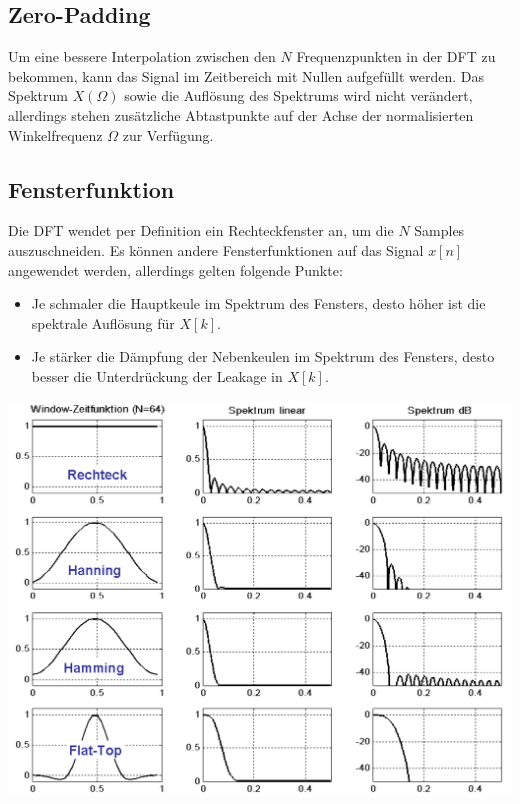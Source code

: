 \subsection{Zero-Padding}
Um eine bessere Interpolation zwischen den $N$ Frequenzpunkten in der DFT zu
bekommen, kann das Signal im Zeitbereich mit Nullen aufgefüllt werden.
Das Spektrum $X(\Omega)$ sowie die Auflösung des Spektrums wird nicht verändert, 
allerdings stehen zusätzliche Abtastpunkte auf der Achse der normalisierten 
Winkelfrequenz $\Omega$ zur Verfügung.

\subsection{Fensterfunktion}
Die DFT wendet per Definition ein Rechteckfenster an, um die $N$ Samples
auszuschneiden. Es können andere Fensterfunktionen auf das Signal $x[n]$
angewendet werden, allerdings gelten folgende Punkte:
\begin{itemize}[noitemsep,topsep=3pt]
	\item Je schmaler die Hauptkeule im Spektrum des Fensters, desto höher ist
	die spektrale Auflösung für $X[k]$.
	\item Je stärker die Dämpfung der Nebenkeulen im Spektrum des Fensters, desto
	besser die Unterdrückung der Leakage in $X[k]$.
\end{itemize}

\begin{center}
	\includegraphics[width=.70\textwidth]{../fig/windows}
\end{center}

